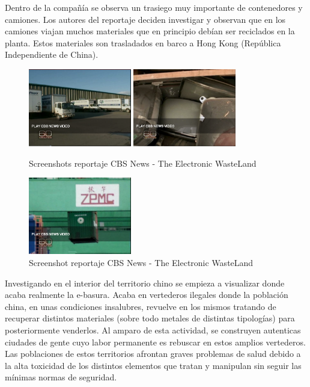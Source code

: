 Dentro de la compañía se observa un trasiego muy importante de contenedores y camiones. Los autores del reportaje deciden investigar y observan que en los camiones viajan muchos materiales que en principio debían ser reciclados en la planta. Estos materiales son trasladados en barco a Hong Kong (República Independiente de China).

\begin{figure}[H]
\begin{center}
\includegraphics[width=0.4\textwidth]{img/screen2}
\includegraphics[width=0.4\textwidth]{img/screen3}
\caption{Screenshots reportaje CBS News - The Electronic WasteLand}
\end{center}
\end{figure}

\begin{figure}[H]
\begin{center}
\includegraphics[width=0.4\textwidth]{img/screen4}
\caption{Screenshot reportaje CBS News - The Electronic WasteLand}
\end{center}
\end{figure}

Investigando en el interior del territorio chino se empieza a visualizar donde acaba realmente la e-basura. Acaba en vertederos ilegales donde la población china, en unas condiciones insalubres, revuelve en los mismos tratando de recuperar distintos materiales (sobre todo metales de distintas tipologías) para posteriormente venderlos. Al amparo de esta actividad, se construyen autenticas ciudades de gente cuyo labor permanente es rebuscar en estos amplios vertederos. Las poblaciones de estos territorios afrontan graves problemas de salud debido a la alta toxicidad de los distintos elementos que tratan y manipulan sin seguir las mínimas normas de seguridad. 

